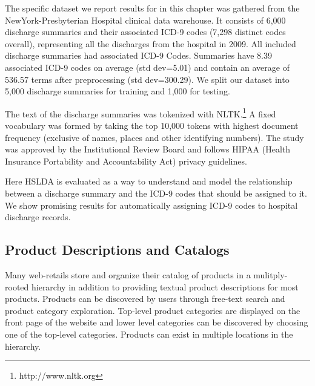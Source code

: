 The specific dataset we report results for in this chapter was gathered from the NewYork-Presbyterian Hospital clinical data warehouse. 
It consists of 6,000 discharge summaries and
their associated ICD-9 codes (7,298 distinct codes overall), representing all
the discharges from the hospital in 2009. All included discharge summaries had associated ICD-9 Codes.
Summaries have 8.39 associated ICD-9
codes on average (std dev=5.01) and contain an average of 536.57 terms after
preprocessing (std dev=300.29). We split our dataset into 5,000 discharge
summaries for training and 1,000 for testing.

The text of the discharge summaries was tokenized with
NLTK.\footnote{http://www.nltk.org} A fixed vocabulary was formed by taking
the top 10,000 tokens with highest document frequency (exclusive of names,
places and other identifying numbers). The study was approved
by the Institutional Review Board and follows HIPAA (Health
Insurance Portability and Accountability Act) privacy guidelines.

Here HSLDA is evaluated as a way to understand and model the relationship between a discharge summary and the ICD-9 codes that should be assigned to it.  We show promising results for automatically assigning ICD-9 codes to hospital discharge records.  


\subsection{Product Descriptions and Catalogs}

Many web-retails store and organize their catalog of products in a
mulitply-rooted hierarchy in addition to providing textual product descriptions 
for most products. Products can be discovered by users
through free-text search and product category exploration. Top-level
product categories are displayed on the front page of the website and lower
level categories can be discovered by choosing one of the top-level categories.
Products can exist in multiple locations in the hierarchy.

